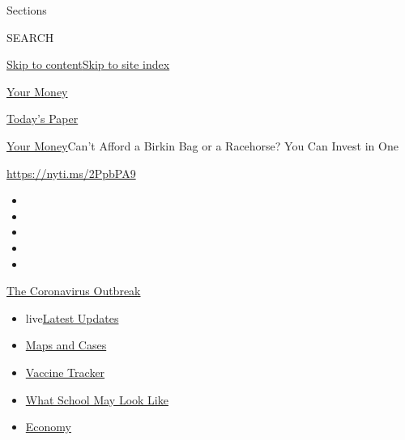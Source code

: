 Sections

SEARCH

\protect\hyperlink{site-content}{Skip to
content}\protect\hyperlink{site-index}{Skip to site index}

\href{https://www.nytimes.com/section/your-money}{Your Money}

\href{https://myaccount.nytimes.com/auth/login?response_type=cookie\&client_id=vi}{}

\href{https://www.nytimes.com/section/todayspaper}{Today's Paper}

\href{/section/your-money}{Your Money}\textbar{}Can't Afford a Birkin
Bag or a Racehorse? You Can Invest in One

\url{https://nyti.ms/2PpbPA9}

\begin{itemize}
\item
\item
\item
\item
\item
\end{itemize}

\href{https://www.nytimes.com/news-event/coronavirus?action=click\&pgtype=Article\&state=default\&region=TOP_BANNER\&context=storylines_menu}{The
Coronavirus Outbreak}

\begin{itemize}
\tightlist
\item
  live\href{https://www.nytimes.com/2020/08/01/world/coronavirus-covid-19.html?action=click\&pgtype=Article\&state=default\&region=TOP_BANNER\&context=storylines_menu}{Latest
  Updates}
\item
  \href{https://www.nytimes.com/interactive/2020/us/coronavirus-us-cases.html?action=click\&pgtype=Article\&state=default\&region=TOP_BANNER\&context=storylines_menu}{Maps
  and Cases}
\item
  \href{https://www.nytimes.com/interactive/2020/science/coronavirus-vaccine-tracker.html?action=click\&pgtype=Article\&state=default\&region=TOP_BANNER\&context=storylines_menu}{Vaccine
  Tracker}
\item
  \href{https://www.nytimes.com/interactive/2020/07/29/us/schools-reopening-coronavirus.html?action=click\&pgtype=Article\&state=default\&region=TOP_BANNER\&context=storylines_menu}{What
  School May Look Like}
\item
  \href{https://www.nytimes.com/live/2020/07/31/business/stock-market-today-coronavirus?action=click\&pgtype=Article\&state=default\&region=TOP_BANNER\&context=storylines_menu}{Economy}
\end{itemize}


